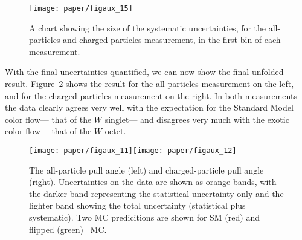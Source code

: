 \begin{figure}[htbp]
  \centering
    \texttt{[image: paper/figaux\_15]}
  \caption{A chart showing the size of the systematic uncertainties, for the all-particles and charged particles measurement, in the first bin of each measurement.}
  \label{fig:color:unfolding:uncert_chart}
\end{figure}

With the final uncertainties quantified, we can now show the final unfolded result. Figure~\ref{fig:color:unfolding:final} shows the result for the all particles measurement on the left, and for the charged particles measurement on the right. In both measurements the data clearly agrees very well with the expectation for the Standard Model color flow--- that of the $W$ singlet--- and disagrees very much with the exotic color flow--- that of the $W$ octet. 










\begin{figure}[h!]
\begin{center}
\texttt{[image: paper/figaux\_11]}\texttt{[image: paper/figaux\_12]}
 \caption{The all-particle pull angle (left) and charged-particle pull angle (right).
    Uncertainties on the data are shown as orange bands, with the darker band
    representing the statistical uncertainty only and the lighter band
    showing the total uncertainty (statistical plus systematic). Two MC predicitions
    are shown for SM (red) and flipped (green) \PowPythia\ MC.}
 \label{fig:color:unfolding:final}
  \end{center}
\end{figure}

